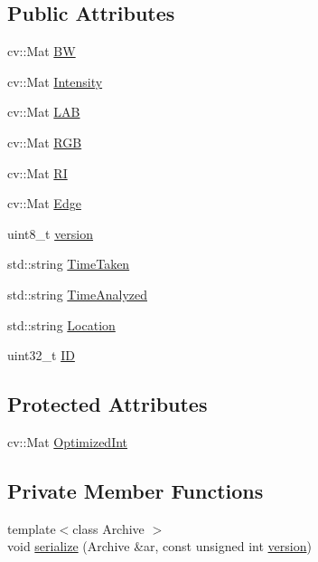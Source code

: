 \subsection*{Public Attributes}
\begin{DoxyCompactItemize}
\item 
cv\+::\+Mat \hyperlink{class_soil_analyzer_1_1_soil_ae11b578192ebae3165f75c09d6116f74}{B\+W}
\item 
cv\+::\+Mat \hyperlink{class_soil_analyzer_1_1_soil_a6f56200f2722df5b849d8cddd094c852}{Intensity}
\item 
cv\+::\+Mat \hyperlink{class_soil_analyzer_1_1_soil_a59ee773ff73380a12b1c2af3b86f6638}{L\+A\+B}
\item 
cv\+::\+Mat \hyperlink{class_soil_analyzer_1_1_soil_a4a328e0ebe7f1f3c5a1c4c581180d19e}{R\+G\+B}
\item 
cv\+::\+Mat \hyperlink{class_soil_analyzer_1_1_soil_abe8693b60a3d88433ffb8255b8d260c3}{R\+I}
\item 
cv\+::\+Mat \hyperlink{class_soil_analyzer_1_1_soil_ab867a74ecebcd5a3d84e2f9ea806b874}{Edge}
\item 
uint8\+\_\+t \hyperlink{class_soil_analyzer_1_1_soil_ac32132912c73338edf60b5cd6de4feb8}{version}
\item 
std\+::string \hyperlink{class_soil_analyzer_1_1_soil_ae459914e6c463e97d1761d791f653b2d}{Time\+Taken}
\item 
std\+::string \hyperlink{class_soil_analyzer_1_1_soil_a3c1c025be53aae3cbe858b7a7936d8dd}{Time\+Analyzed}
\item 
std\+::string \hyperlink{class_soil_analyzer_1_1_soil_a9c3cabd71691bfc4bb56d32fdb298e72}{Location}
\item 
uint32\+\_\+t \hyperlink{class_soil_analyzer_1_1_soil_a0011c3cd2a504e34c5962cbf72e397da}{I\+D}
\end{DoxyCompactItemize}
\subsection*{Protected Attributes}
\begin{DoxyCompactItemize}
\item 
cv\+::\+Mat \hyperlink{class_soil_analyzer_1_1_soil_a27f7c15f63cbf64c07ceedb30c25e861}{Optimized\+Int}
\end{DoxyCompactItemize}
\subsection*{Private Member Functions}
\begin{DoxyCompactItemize}
\item 
{\footnotesize template$<$class Archive $>$ }\\void \hyperlink{class_soil_analyzer_1_1_soil_a6e8ff0bf93b0010fab557f65869f2b3d}{serialize} (Archive \&ar, const unsigned int \hyperlink{class_soil_analyzer_1_1_soil_ac32132912c73338edf60b5cd6de4feb8}{version})
\end{DoxyCompactItemize}
